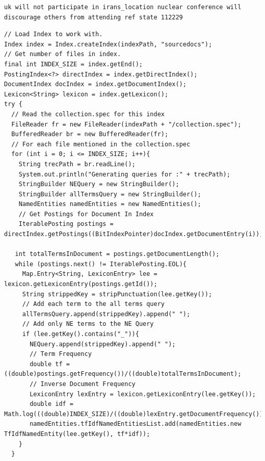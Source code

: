 \documentclass{l4proj}
\newenvironment{codelisting}{\captionsetup{type=listing}}{}
\begin{document}
\begin{codelisting}
\begin{verbatim}
uk will not participate in irans_location nuclear conference will discourage others from attending ref state 112229
\end{verbatim}
\label{code:subject_query}
\end{codelisting}

\begin{codelisting}
\begin{verbatim}
// Load Index to work with.
Index index = Index.createIndex(indexPath, "sourcedocs");
// Get number of files in index.
final int INDEX_SIZE = index.getEnd();
PostingIndex<?> directIndex = index.getDirectIndex();
DocumentIndex docIndex = index.getDocumentIndex();
Lexicon<String> lexicon = index.getLexicon();
try {
  // Read the collection.spec for this index
  FileReader fr = new FileReader(indexPath + "/collection.spec");
  BufferedReader br = new BufferedReader(fr);
  // For each file mentioned in the collection.spec
  for (int i = 0; i <= INDEX_SIZE; i++){
    String trecPath = br.readLine();
	System.out.println("Generating queries for :" + trecPath);
	StringBuilder NEQuery = new StringBuilder();
	StringBuilder allTermsQuery = new StringBuilder();
	NamedEntities namedEntities = new NamedEntities();
	// Get Postings for Document In Index
	IterablePosting postings = directIndex.getPostings((BitIndexPointer)docIndex.getDocumentEntry(i));
				
   int totalTermsInDocument = postings.getDocumentLength();
   while (postings.next() != IterablePosting.EOL){
     Map.Entry<String, LexiconEntry> lee = lexicon.getLexiconEntry(postings.getId());
     String strippedKey = stripPunctuation(lee.getKey());
     // Add each term to the all terms query
	 allTermsQuery.append(strippedKey).append(" ");
	 // Add only NE terms to the NE Query 
	 if (lee.getKey().contains("_")){
	   NEQuery.append(strippedKey).append(" ");
       // Term Frequency
       double tf = ((double)postings.getFrequency())/((double)totalTermsInDocument);
       // Inverse Document Frequency
	   LexiconEntry lexEntry = lexicon.getLexiconEntry(lee.getKey());
	   double idf = Math.log(((double)INDEX_SIZE)/((double)lexEntry.getDocumentFrequency()));
       namedEntities.tfIdfNamedEntitiesList.add(namedEntities.new TfIdfNamedEntity(lee.getKey(), tf*idf));
    }
  }
\end{verbatim}
\label{code:query_generation}
\end{codelisting}
\end{document}
